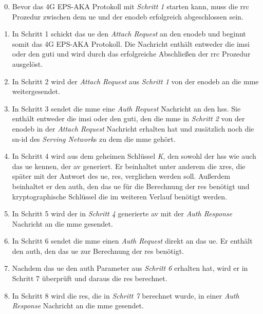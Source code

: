 \begin{enumerate}
\setcounter{enumi}{-1}
\item Bevor das 4G EPS-AKA Protokoll mit \textit{Schritt 1} starten kann, muss die \gls{rrc} Prozedur zwischen dem \gls{ue} und der \gls{enodeb} erfolgreich abgeschlossen sein.

\item In Schritt 1 schickt das \gls{ue} den \textit{Attach Request} an den \gls{enodeb} und beginnt somit das 4G EPS-AKA Protokoll.
Die Nachricht enthält entweder die \gls{imsi} oder den \gls{guti} und wird durch das erfolgreiche Abschließen der \gls{rrc} Prozedur ausgelöst.

\item In Schritt 2 wird der \textit{Attach Request} aus \textit{Schritt 1} von der \gls{enodeb} an die \gls{mme} weitergesendet.

\item In Schritt 3 sendet die \gls{mme} eine \textit{Auth Request} Nachricht an den \gls{hss}.
Sie enthält entweder die \gls{imsi} oder den \gls{guti}, den die \gls{mme} in \textit{Schritt 2} von der \gls{enodeb} in der \textit{Attach Request} Nachricht erhalten hat und zusätzlich noch die \gls{sn-id} des \textit{Serving Network}s zu dem die \gls{mme} gehört.

\item In Schritt 4 wird aus dem geheimen Schlüssel \textit{K}, den sowohl der \gls{hss} wie auch das \gls{ue} kennen, der \gls{av} generiert.
Er beinhaltet unter anderem die \gls{xres}, die später mit der Antwort des \gls{ue}, \gls{res}, verglichen werden soll.
Außerdem beinhaltet er den \gls{auth}, den das \gls{ue} für die Berechnung der \gls{res} benötigt und kryptographische Schlüssel die im weiteren Verlauf benötigt werden.

\item In Schritt 5 wird der in \textit{Schritt 4} generierte \gls{av} mit der \textit{Auth Response} Nachricht an die \gls{mme} gesendet.

\item In Schritt 6 sendet die \gls{mme} einen \textit{Auth Request} direkt an das \gls{ue}.
Er enthält den \gls{auth}, den das \gls{ue} zur Berechnung der \gls{res} benötigt.

\item Nachdem das \gls{ue} den \gls{auth} Parameter aus \textit{Schritt 6} erhalten hat, wird er in Schritt 7 überprüft und daraus die \gls{res} berechnet.

\item In Schritt 8 wird die \gls{res}, die in \textit{Schritt 7} berechnet wurde, in einer \textit{Auth Response} Nachricht an die \gls{mme} gesendet.


\end{enumerate}
